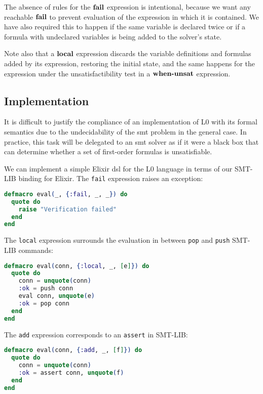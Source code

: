 The absence of rules for the $\textbf{fail}$ expression is intentional, because we want
any reachable $\textbf{fail}$ to prevent evaluation of the expression in which it is
contained.  We have also required this to happen if the same variable is
declared twice or if a formula with undeclared variables is being added to the 
solver's state.

Note also that a $\textbf{local}$ expression discards the variable definitions and
formulas added by its expression, restoring the initial state, and the same
happens for the expression under the unsatisfactibility test in a $\textbf{when-unsat}$
expression.

\subsection{Implementation}
\label{integ:l0implementation}

It is difficult to justify the compliance of an implementation of L0 with its
formal semantics due to the undecidability of the \gls{smt} problem in the 
general case. In practice, this task will be delegated to an \acrshort{smt} 
solver as if it were a black box that can determine whether a set of first-order
formulas is unsatisfiable.

We can implement a simple Elixir \gls{dsl} for the L0 language in terms of our
SMT-LIB binding for Elixir. The \verb|fail| expression raises an exception:

\begin{lstlisting}[language=elixir,numbers=none,frame=none]
defmacro eval(_, {:fail, _, _}) do
  quote do
    raise "Verification failed"
  end
end
\end{lstlisting}

The \verb|local| expression surrounds the evaluation in between \verb|pop| and
\verb|push| SMT-LIB commands:

\begin{lstlisting}[language=elixir,numbers=none,frame=none]
defmacro eval(conn, {:local, _, [e]}) do
  quote do
    conn = unquote(conn)
    :ok = push conn
    eval conn, unquote(e)
    :ok = pop conn
  end
end
\end{lstlisting}

The \verb|add| expression corresponds to an \verb|assert| in SMT-LIB:

\begin{lstlisting}[language=elixir,numbers=none,frame=none]
defmacro eval(conn, {:add, _, [f]}) do
  quote do
    conn = unquote(conn)
    :ok = assert conn, unquote(f)
  end
end
\end{lstlisting}

